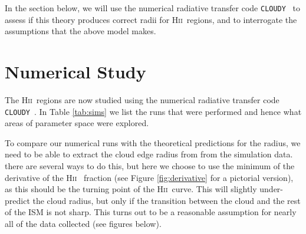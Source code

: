 \documentclass[a4paper]{article}
\newcommand{\hii}{H\textsc{ii}~}
\newcommand{\cloudy}{{\tt CLOUDY}~}
\begin{document}
In the section below, we will use the numerical radiative transfer code
\cloudy \citep{ferland_2017_2017} to assess if this theory produces
correct radii for \hii regions, and to interrogate the assumptions that the
above model makes.

\section{Numerical Study}

The \hii regions are now studied using the numerical radiative transfer code
\cloudy \citep{ferland_2017_2017}. In Table \ref{tab:sims} we list the
runs that were performed and hence what areas of parameter space were explored.

\begin{table}[!h]
    \centering
    \caption{The runs presented below. Note that $S_*$ refers to the number of
        \emph{ionising} photons, i.e. this is {\tt q(h)} in the \cloudy code.}
    \label{tab:sims}
\end{table}
To compare our numerical runs with the theoretical predictions for the
\citet{stromgren_physical_1939} radius, we need to be able to extract the
cloud edge radius from from the simulation data. there are several ways to do
this, but here we choose to use the minimum of the derivative of the \hii
fraction (see Figure \ref{fig:derivative} for a pictorial version), as this
should be the turning point of the \hii curve. This will slightly
under-predict the cloud radius, but only if the transition between the cloud
and the rest of the ISM is not sharp. This turns out to be a reasonable
assumption for nearly all of the data collected (see figures below).
\end{document}
